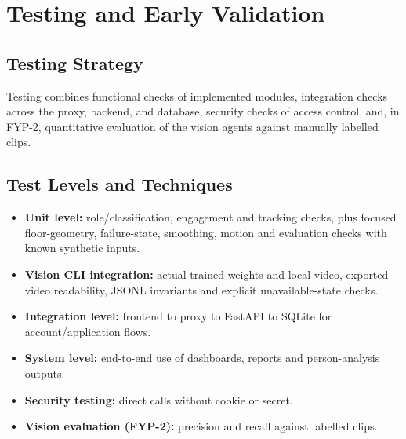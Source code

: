 \chapter{Testing and Early Validation}
\label{ch:testing}
\section{Testing Strategy}
Testing combines functional checks of implemented modules, integration checks across the proxy, backend, and database, security checks of access control, and, in FYP-2, quantitative evaluation of the vision agents against manually labelled clips.

\section{Test Levels and Techniques}
\begin{itemize}
\item \textbf{Unit level:} role/classification, engagement and tracking checks, plus focused floor-geometry, failure-state, smoothing, motion and evaluation checks with known synthetic inputs.
\item \textbf{Vision CLI integration:} actual trained weights and local video, exported video readability, JSONL invariants and explicit unavailable-state checks.
\item \textbf{Integration level:} frontend to proxy to FastAPI to SQLite for account/application flows.
\item \textbf{System level:} end-to-end use of dashboards, reports and person-analysis outputs.
\item \textbf{Security testing:} direct calls without cookie or secret.
\item \textbf{Vision evaluation (FYP-2):} precision and recall against labelled clips.
\end{itemize}

